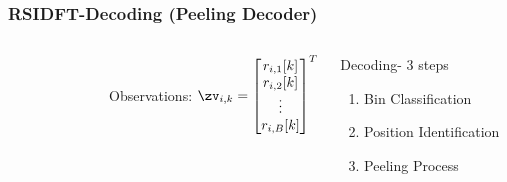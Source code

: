 \begin{frame}\frametitle{RSIDFT-Decoding (Peeling Decoder)}
\begin{columns}
		\begin{figure}[h!]
			\begin{center}
				\resizebox{1.0\textwidth}{!}{}	
			\end{center}	
		\end{figure}
	    \begin{block}{Observations:}
	          $
	    		\zv_{i,k} = \begin{bmatrix}
	    		r_{i,1}[k]\\
	    		r_{i,2}[k]\\
	    		\vdots\\
	    		r_{i,B}[k]
	    		\end{bmatrix}^{T}
	    		$
	    	\end{block}
	    	\begin{block}{Decoding- 3 steps}	
	    		\begin{enumerate}
	    			\item Bin Classification
	    			\item Position Identification
	    			\item Peeling Process
	    		\end{enumerate}
	
	    \end{block}
	
		
\end{columns}
	
		
						
\end{frame}

